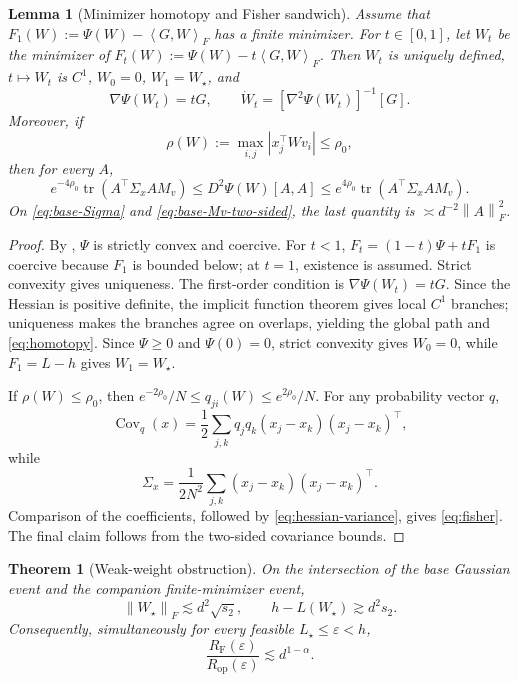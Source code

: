 \documentclass[11pt]{article}
\newtheorem{theorem}{Theorem}[section]
\newtheorem{lemma}[lemma]{Lemma}
\theoremstyle{definition}
\newcommand{\tr}{\operatorname{tr}}
\newcommand{\Cov}{\operatorname{Cov}}
\newcommand{\ip}[2]{\left\langle #1,#2\right\rangle_F}
\newcommand{\normF}[1]{\left\lVert #1\right\rVert_F}
\newcommand{\RF}{R_{\mathrm F}}
\newcommand{\Rop}{R_{\mathrm{op}}}
\newcommand{\eps}{\varepsilon}
\begin{document}
\begin{lemma}[Minimizer homotopy and Fisher sandwich]
\label{lem:homotopy-fisher}
Assume that $F_1(W):=\Psi(W)-\ip{G}{W}$ has a finite minimizer.  For
$t\in[0,1]$, let $W_t$ be the minimizer of
$F_t(W):=\Psi(W)-t\ip{G}{W}$.  Then $W_t$ is uniquely defined,
$t\mapsto W_t$ is $C^1$, $W_0=0$, $W_1=W_\star$, and
\begin{equation}
 \nabla\Psi(W_t)=tG,
 \qquad
 \dot W_t=[\nabla^2\Psi(W_t)]^{-1}[G].
 \label{eq:homotopy}
\end{equation}
Moreover, if
\[
 \rho(W):=\max_{i,j}|x_j^\top Wv_i|\leq\rho_0,
\]
then for every $A$,
\begin{equation}
 e^{-4\rho_0}\tr(A^\top\Sigma_x A M_v)
 \leq D^2\Psi(W)[A,A]
 \leq e^{4\rho_0}\tr(A^\top\Sigma_x A M_v).
 \label{eq:fisher}
\end{equation}
On \eqref{eq:base-Sigma} and \eqref{eq:base-Mv-two-sided}, the last
quantity is $\asymp d^{-2}\normF{A}^2$.
\end{lemma}

\begin{proof}
By , $\Psi$ is strictly convex and coercive.
For $t<1$,
$F_t=(1-t)\Psi+tF_1$ is coercive because $F_1$ is bounded below; at
$t=1$, existence is assumed.  Strict convexity gives uniqueness.  The
first-order condition is $\nabla\Psi(W_t)=tG$.  Since the Hessian is
positive definite, the implicit function theorem gives local $C^1$
branches; uniqueness makes the branches agree on overlaps, yielding the
global path and \eqref{eq:homotopy}.  Since $\Psi\geq0$ and
$\Psi(0)=0$, strict convexity gives $W_0=0$, while $F_1=L-h$ gives
$W_1=W_\star$.

If $\rho(W)\leq\rho_0$, then
$e^{-2\rho_0}/N\leq q_{ji}(W)\leq e^{2\rho_0}/N$.  For any probability
vector $q$,
\[
 \Cov_q(x)=\frac12\sum_{j,k}q_jq_k(x_j-x_k)(x_j-x_k)^\top,
\]
while
\[
 \Sigma_x=\frac1{2N^2}\sum_{j,k}(x_j-x_k)(x_j-x_k)^\top.
\]
Comparison of the coefficients, followed by
\eqref{eq:hessian-variance}, gives \eqref{eq:fisher}.  The final claim
follows from the two-sided covariance bounds.
\end{proof}

\begin{theorem}[Weak-weight obstruction]
\label{thm:weak}
On the intersection of the base Gaussian event and the companion
finite-minimizer event,
\begin{equation}
 \normF{W_\star}\lesssim d^2\sqrt{s_2},
 \qquad
 h-L(W_\star)\gtrsim d^2s_2.
 \label{eq:weak-localization}
\end{equation}
Consequently, simultaneously for every feasible
$L_\star\leq\eps<h$,
\begin{equation}
 \frac{\RF(\eps)}{\Rop(\eps)}\lesssim d^{1-\alpha}.
 \label{eq:weak-obstruction}
\end{equation}
\end{theorem}
\end{document}
